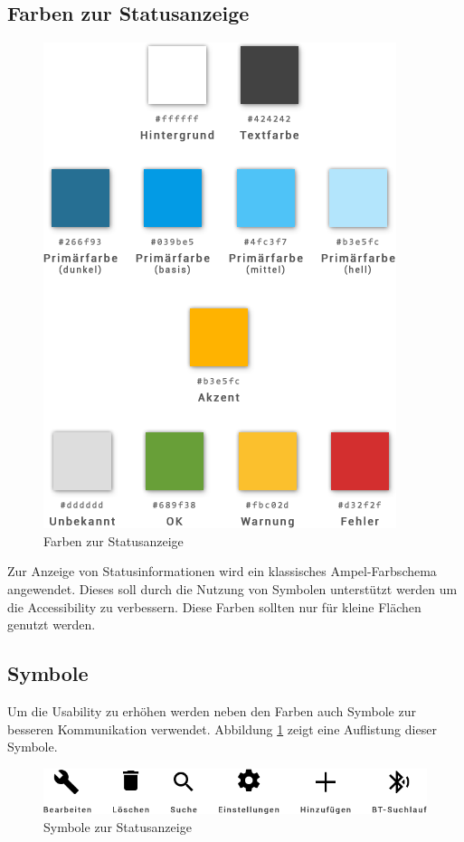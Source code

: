 \subsection{Farben zur Statusanzeige}
\label{subsec:Farben zur Statusanzeige}
\begin{figure}[H]
    \begin{center}
        \includegraphics[trim=0 0 0 420,clip,scale=0.5]{uiux/res/basic_colors}
    \end{center}
    \caption{Farben zur Statusanzeige}
\end{figure}
Zur Anzeige von Statusinformationen wird ein klassisches Ampel-Farbschema angewendet. Dieses soll durch die Nutzung von Symbolen unterstützt werden um die Accessibility zu verbessern. Diese Farben sollten nur für kleine Flächen genutzt werden.

\subsection{Symbole}
\label{subsec:Symbole}

Um die Usability zu erhöhen werden neben den Farben auch Symbole zur besseren Kommunikation verwendet. Abbildung \ref{abb:statusSymbols} zeigt eine Auflistung dieser Symbole.

\vspace{0.5cm}

\begin{figure}[H]
    \begin{center}
        \includegraphics[scale=0.5]{uiux/res/icons}
    \end{center}
    \caption{Symbole zur Statusanzeige}
    \label{abb:statusSymbols}
\end{figure}

\pagebreak